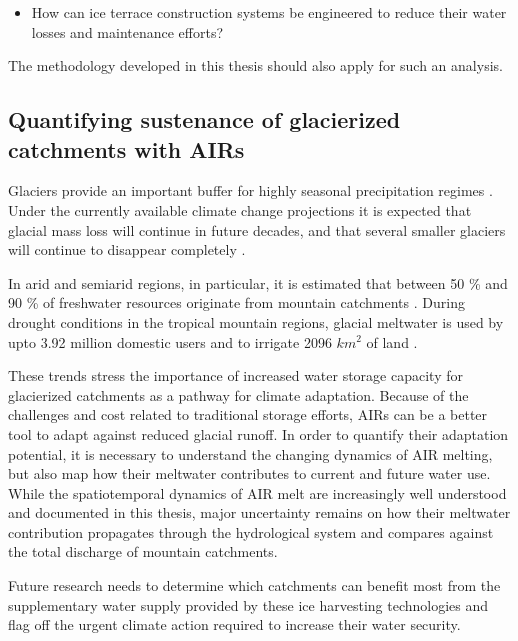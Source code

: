 \begin{itemize}

	\item How can ice terrace construction systems be engineered to reduce their water losses and maintenance
	      efforts?

\end{itemize}

The methodology developed in this thesis should also apply for such an analysis.

\subsection{Quantifying sustenance of glacierized catchments with AIRs}

Glaciers provide an important buffer for highly seasonal precipitation regimes
\citep{kaserContributionPotentialGlaciers2010}. Under the currently available climate change projections it is
expected that glacial mass loss will continue in future decades, and that several smaller glaciers will continue
to disappear completely \citep{rabatelCurrentStateGlaciers2013}.

In arid and semiarid regions, in particular, it is estimated that between 50 \% and 90 \% of freshwater
resources originate from mountain catchments \citep{messerliMountainsWorldVulnerable2004}. During drought
conditions in the tropical mountain regions, glacial meltwater is used by upto 3.92 million domestic users and
to irrigate 2096 $km^2$ of land \citep{buytaertGlacialMeltContent2017}.

These trends stress the importance of increased water storage capacity for glacierized catchments as a pathway
for climate adaptation. Because of the challenges and cost related to traditional storage efforts, AIRs can be
a better tool to adapt against reduced glacial runoff. In order to quantify their adaptation potential, it
is necessary to understand the changing dynamics of AIR melting, but also map how their meltwater contributes to
current and future water use. While the spatiotemporal dynamics of AIR melt are increasingly well understood and
documented in this thesis, major uncertainty remains on how their meltwater contribution propagates through the
hydrological system and compares against the total discharge of mountain catchments.

Future research needs to determine which catchments can benefit most from the supplementary water supply
provided by these ice harvesting technologies and flag off the urgent climate action required to increase their
water security.

